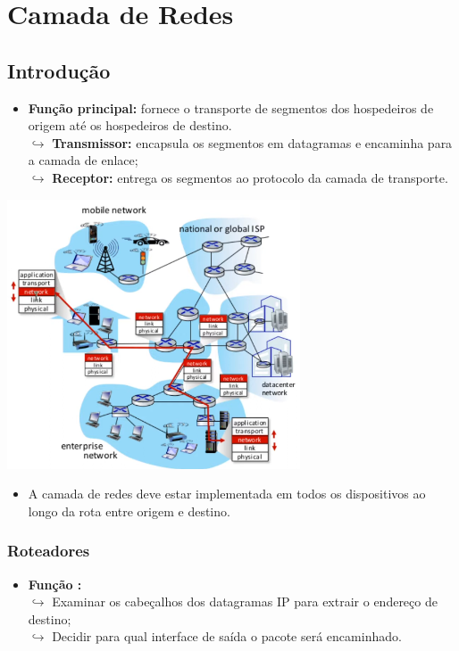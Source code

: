 \section{Camada de Redes}

    \subsection{Introdução}

        \begin{itemize}[left=0.5cm, align=left, nosep]
            \item \textbf{Função principal:} fornece o transporte de segmentos dos hospedeiros de origem até os hospedeiros de destino. \\        
                $\hookrightarrow$ \textbf{Transmissor:} encapsula os segmentos em datagramas e encaminha para a camada de enlace; \\
                $\hookrightarrow$ \textbf{Receptor:} entrega os segmentos ao protocolo da camada de transporte.
        \end{itemize}

        \begin{center}
            \includegraphics[width=0.65\textwidth]{img/cap-04/camada-de-redes-introd.png}
        \end{center}

        \begin{itemize}[left=0.5cm, align=left, nosep]
            \item A camada de redes deve estar implementada em todos os dispositivos ao longo da rota entre origem e destino.
        \end{itemize}

        \subsubsection*{Roteadores}
            \begin{itemize}[left=0.5cm, align=left, nosep]
            \item \textbf{Função :} \\
                $\hookrightarrow$ Examinar os cabeçalhos dos datagramas IP para extrair o endereço de destino; \\
                $\hookrightarrow$ Decidir para qual interface de saída o pacote será encaminhado.
            \end{itemize}

